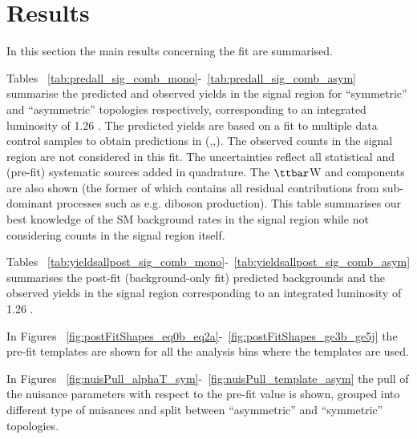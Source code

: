 \section{Results}
\label{sec:results}

In this section the main results concerning the fit are summarised. 

Tables ~\ref{tab:predall_sig_comb_mono}-~\ref{tab:predall_sig_comb_asym} summarise the predicted and observed yields in the signal region for ``symmetric'' and ``asymmetric'' topologies respectively, 
corresponding to an integrated luminosity of 1.26 \ifb.
The predicted yields are based on a fit to multiple data control samples to obtain predictions in (\nj,\nb,\scalht). 
The observed counts in the signal region are not considered in this fit. 
The uncertainties reflect all statistical and (pre-fit) systematic sources added in quadrature. 
The $\ttbar$W and \znunu components are also shown (the former of which contains all residual contributions from sub-dominant processes such as e.g. diboson production). 
This table summarises our best knowledge of the SM background rates in the signal region while not considering counts in the signal region itself. 





Tables ~\ref{tab:yieldsallpost_sig_comb_mono}-~\ref{tab:yieldsallpost_sig_comb_asym} summarises the post-fit (background-only fit) predicted backgrounds and the 
observed yields in the signal region corresponding to an integrated luminosity of 1.26 \ifb. 





In Figures ~\ref{fig:postFitShapes_eq0b_eq2a}-~\ref{fig:postFitShapes_ge3b_ge5j} the pre-fit \MHT templates are shown for all the analysis bins where the \MHT templates are used.

In Figures ~\ref{fig:nuisPull_alphaT_sym}-~\ref{fig:nuisPull_template_asym} the pull of the nuisance parameters with respect to the pre-fit value is shown, 
grouped into different type of nuisances and split between ``asymmetric'' and ``symmetric'' topologies.


